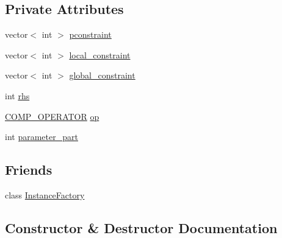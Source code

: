 \subsection*{Private Attributes}
\begin{DoxyCompactItemize}
\item 
vector$<$ int $>$ \mbox{\hyperlink{classgraphsat_1_1_default_counter_constraint_af5823c3de53e85a79ea1381d7ab647fb}{pconstraint}}
\item 
vector$<$ int $>$ \mbox{\hyperlink{classgraphsat_1_1_default_counter_constraint_ab2cdc3b51359caed2b56fb491cc084e0}{local\+\_\+constraint}}
\item 
vector$<$ int $>$ \mbox{\hyperlink{classgraphsat_1_1_default_counter_constraint_a89de77271555799475d5152198f22e57}{global\+\_\+constraint}}
\item 
int \mbox{\hyperlink{classgraphsat_1_1_default_counter_constraint_a2f3baba7436bb3a9def3c003abff709d}{rhs}}
\item 
\mbox{\hyperlink{namespacegraphsat_acfb5939f9bdafbd9aea0d084b9a56f69}{C\+O\+M\+P\+\_\+\+O\+P\+E\+R\+A\+T\+OR}} \mbox{\hyperlink{classgraphsat_1_1_default_counter_constraint_ae7ff7ae9b24cfff60155ad47da17ca60}{op}}
\item 
int \mbox{\hyperlink{classgraphsat_1_1_default_counter_constraint_aa29865be3042a8fccb00a9adde1edf32}{parameter\+\_\+part}}
\end{DoxyCompactItemize}
\subsection*{Friends}
\begin{DoxyCompactItemize}
\item 
class \mbox{\hyperlink{classgraphsat_1_1_default_counter_constraint_ad4b3c25c041701ae56dc1e78df779d2f}{Instance\+Factory}}
\end{DoxyCompactItemize}


\subsection{Constructor \& Destructor Documentation}
\mbox{\label{classgraphsat_1_1_default_counter_constraint_aafe9f228a3ea6a39fc70ece8b9300875}} 
